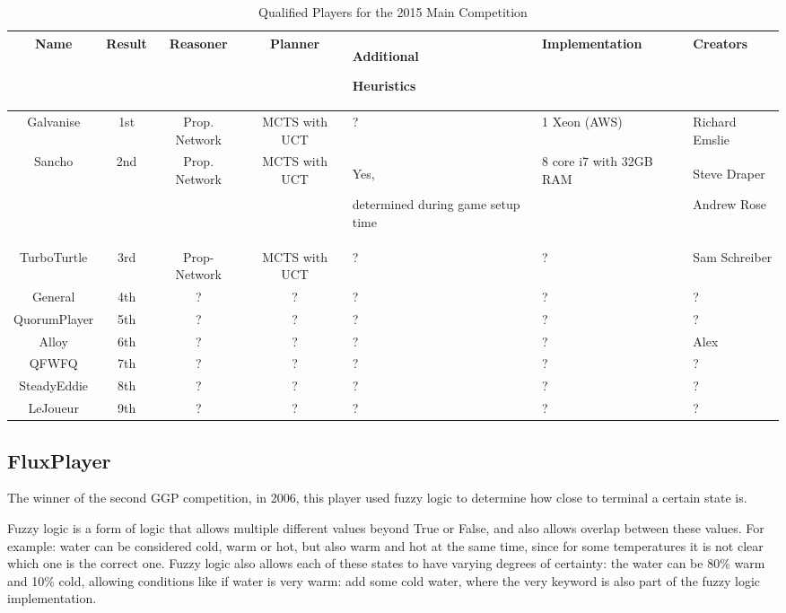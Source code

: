 \begin{table}[!h]
\caption{Qualified Players for the 2015 Main Competition}
\label{2015 World Competition}
\small
\begin{tabular}{| c | c | c | c | p{2.5cm} | p{2.5cm} | p{2.5cm} |}
\hline  Name & Result & Reasoner & Planner & Additional \par Heuristics & Implementation & Creators \\
\hline  Galvanise & 1st & Prop. Network & MCTS with UCT & ? & 1 Xeon (AWS) & Richard Emslie \\
\hline  Sancho & 2nd & Prop. Network & MCTS with UCT & Yes, \par determined during game setup time & 8 core i7 with 32GB RAM & Steve Draper \par Andrew Rose \\
\hline  TurboTurtle & 3rd & Prop- Network & MCTS with UCT & ? & ? & Sam Schreiber \\
\hline  General & 4th & ? & ? & ? & ? & ? \\ %
\hline  QuorumPlayer & 5th & ? & ? & ? & ? & ? \\ %
\hline  Alloy & 6th & ? & ? & ? & ? & Alex \\ %
\hline  QFWFQ & 7th & ? & ? & ? & ? & ? \\ %
\hline  SteadyEddie & 8th & ? & ? & ? & ? & ? \\ %
\hline  LeJoueur & 9th & ? & ? & ? & ? & ? \\ %

\hline
\end{tabular}
\end{table}


\subsection{FluxPlayer}
The winner of the second GGP competition, in 2006, this player used fuzzy logic to determine how close to terminal a certain state is.

Fuzzy logic is a form of logic that allows multiple different values beyond True or False, and also allows overlap between these values. For example: water can be considered cold, warm or hot, but also warm and hot at the same time, since for some temperatures it is not clear which one is the correct one. Fuzzy logic also allows each of these states to have varying degrees of certainty: the water can be 80\% warm and 10\% cold, allowing conditions like if water is very warm: add some cold water, where the very keyword is also part of the fuzzy logic implementation.

